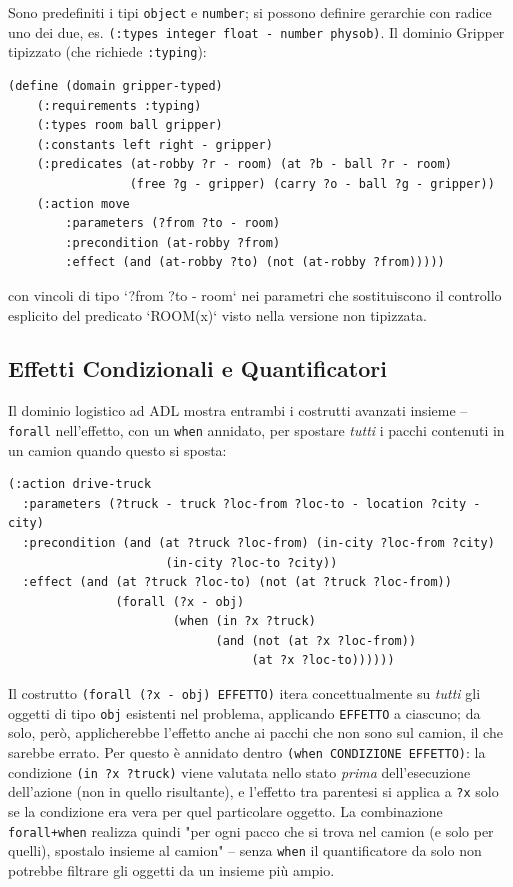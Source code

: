 \documentclass[a4paper,11pt]{article}
\begin{document}
Sono predefiniti i tipi \texttt{object} e \texttt{number}; si possono definire gerarchie con radice uno dei due, es. \texttt{(:types integer float - number physob)}. Il dominio Gripper tipizzato (che richiede \texttt{:typing}):
\begin{lstlisting}
(define (domain gripper-typed)
    (:requirements :typing)
    (:types room ball gripper)
    (:constants left right - gripper)
    (:predicates (at-robby ?r - room) (at ?b - ball ?r - room)
                 (free ?g - gripper) (carry ?o - ball ?g - gripper))
    (:action move
        :parameters (?from ?to - room)
        :precondition (at-robby ?from)
        :effect (and (at-robby ?to) (not (at-robby ?from)))))
\end{lstlisting}
con vincoli di tipo `?from ?to - room` nei parametri che sostituiscono il controllo esplicito del predicato `ROOM(x)` visto nella versione non tipizzata.

\subsection{Effetti Condizionali e Quantificatori}

Il dominio logistico ad ADL mostra entrambi i costrutti avanzati insieme -- \texttt{forall} nell'effetto, con un \texttt{when} annidato, per spostare \emph{tutti} i pacchi contenuti in un camion quando questo si sposta:
\begin{lstlisting}
(:action drive-truck
  :parameters (?truck - truck ?loc-from ?loc-to - location ?city - city)
  :precondition (and (at ?truck ?loc-from) (in-city ?loc-from ?city)
                      (in-city ?loc-to ?city))
  :effect (and (at ?truck ?loc-to) (not (at ?truck ?loc-from))
               (forall (?x - obj)
                       (when (in ?x ?truck)
                             (and (not (at ?x ?loc-from))
                                  (at ?x ?loc-to))))))
\end{lstlisting}
Il costrutto \texttt{(forall (?x - obj) EFFETTO)} itera concettualmente su \emph{tutti} gli oggetti di tipo \texttt{obj} esistenti nel problema, applicando \texttt{EFFETTO} a ciascuno; da solo, però, applicherebbe l'effetto anche ai pacchi che non sono sul camion, il che sarebbe errato. Per questo è annidato dentro \texttt{(when CONDIZIONE EFFETTO)}: la condizione \texttt{(in ?x ?truck)} viene valutata nello stato \emph{prima} dell'esecuzione dell'azione (non in quello risultante), e l'effetto tra parentesi si applica a \texttt{?x} solo se la condizione era vera per quel particolare oggetto. La combinazione \texttt{forall+when} realizza quindi "per ogni pacco che si trova nel camion (e solo per quelli), spostalo insieme al camion" -- senza \texttt{when} il quantificatore da solo non potrebbe filtrare gli oggetti da un insieme più ampio.
\end{document}
